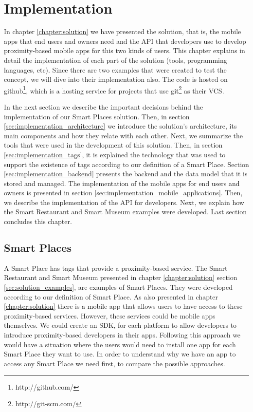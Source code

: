 
\chapter{Implementation}
\label{chapter:implementation}
In chapter \ref{chapter:solution} we have presented the solution, that is,
the mobile apps that end users and owners need and the \gls{API} that developers use
to develop proximity-based mobile apps for this two kinds of users.
This chapter explains in detail the implementation of each part of the solution
(tools, programming languages, etc). Since there are two examples that were
created to test the concept, we will dive into their implementation also.
The code is hosted on
github\footnote{http://github.com/}, which is a hosting service for projects
that use git\footnote{http://git-scm.com/} as their \gls{VCS}.

In the next section we describe the important decisions behind the implementation of our Smart Places solution.
Then, in section \ref{sec:implementation_architecture} we introduce the solution's architecture, its main components and how they relate with each other.
Next, we summarize the tools that were used in the development of this solution.
Then, in section \ref{sec:implementation_tags}, it is explained the technology that was used to support the existence of tags according to our definition of a Smart Place.
Section \ref{sec:implementation_backend} presents the backend and the data model that it is stored and managed.
The implementation of the mobile apps for end users and owners is presented in section \ref{sec:implementation_mobile_applications}.
Then, we describe the implementation of the \gls{API} for developers.
Next, we explain how the Smart Restaurant and Smart Museum examples were developed.
Last section concludes this chapter.

\section{Smart Places}
\label{sec:implementation_smart_places}
A Smart Place has tags that provide a proximity-based service.
The Smart Restaurant and Smart Museum presented in chapter \ref{chapter:solution} section \ref{sec:solution_examples}, are examples of Smart Places.
They were developed according to our definition of Smart Place.
As also presented in chapter \ref{chapter:solution} there is a mobile app that allows users to have access to these proximity-based services.
However, these services could be mobile apps themselves.
We could create an \gls{SDK}, for each platform to allow developers to introduce proximity-based developers in their apps.
Following this approach we would have a situation where the users would need to install one app for each Smart Place they want to use.
In order to understand why we have an app to access any Smart Place we need first, to compare the possible approaches.

